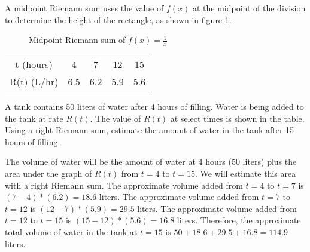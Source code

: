 A midpoint Riemann sum uses the value of $f(x)$ at the midpoint of the division to determine the height of the rectangle, as shown in figure \ref{fig:midriemann}. 

\begin{figure}
    \centering
    \caption{Midpoint Riemann sum of $f(x)=\frac{1}{x}$}
    \label{fig:midriemann}
\end{figure}

\begin{Exercise}[label=rsum1]
	\begin{center}
		\begin{tabular}{c|c|c|c|c}
			t (hours) & 4 & 7 & 12 & 15\\
			R(t) (L/hr) & 6.5 & 6.2 & 5.9 & 5.6\\
		\end{tabular}
	\end{center}
	A tank contains 50 liters of water after 4 hours of filling. Water is being added to the tank at rate $R(t)$. The value of $R(t)$ at select times is shown in the table. Using a right Riemann sum, estimate the amount of water in the tank after 15 hours of filling. 
\end{Exercise}

\begin{Answer}[ref=rsum1]
	The volume of water will be the amount of water at 4 hours (50 liters) plus the area under the graph of $R(t)$ from $t=4$ to $t=15$. We will estimate this area with a right Riemann sum. The approximate volume added from $t=4$ to $t=7$ is $(7-4)*(6.2) = 18.6$ liters. The approximate volume added from $t=7$ to $t=12$ is $(12-7)*(5.9)=29.5$ liters. The approximate volume added from $t=12$ to $t=15$ is $(15-12)*(5.6) = 16.8$ liters. Therefore, the approximate total volume of water in the tank at $t=15$ is $50 + 18.6 + 29.5 + 16.8 = 114.9$ liters. 
\end{Answer}